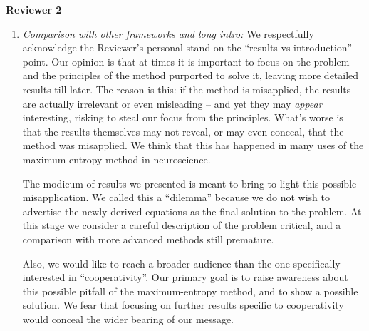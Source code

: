 \documentclass{article}
\begin{document}
\textbf{Reviewer 2}
\begin{enumerate}[wide]
\item \emph{Comparison with other frameworks and long intro:} We
  respectfully acknowledge the Reviewer's personal stand on the
  \enquote{results vs introduction} point. Our opinion is that at times it
  is important to focus on the problem and the principles of the method
  purported to solve it, leaving more detailed results till later. The
  reason is this: if the method is misapplied, the results are actually
  irrelevant or even misleading -- and yet they may \emph{appear}
  interesting, risking to steal our focus from the principles. What's worse
  is that the results themselves may not reveal, or may even conceal, that
  the method was misapplied. We think that this has happened in many uses
  of the maximum-entropy method in neuroscience.

  The modicum of results we presented is meant to bring to light this
  possible misapplication. We called this a \enquote{dilemma} because we do
  not wish to advertise the newly derived equations as the final solution
  to the problem. At this stage we consider a careful description of the
  problem critical, and a comparison with more advanced methods still
  premature.

  Also, we would like to reach a broader audience than the one specifically
  interested in \enquote{cooperativity}. Our primary goal is to raise
  awareness about this possible pitfall of the maximum-entropy method, and
  to show a possible solution. We fear that focusing on further results
  specific to cooperativity would conceal the wider bearing of our message.



\end{enumerate}
\end{document}

